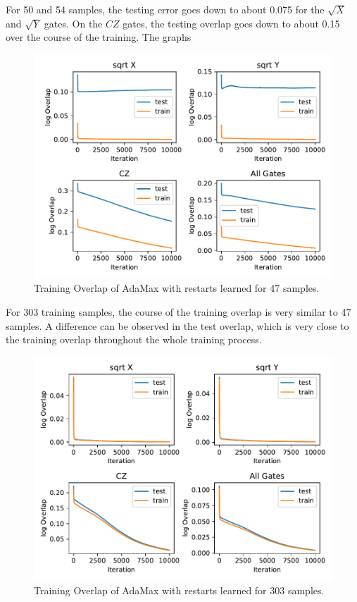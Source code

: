 For 50 and 54 samples, the testing error goes down to about 0.075 for the $\sqrt{X}$ and $\sqrt{Y}$ gates. 
On the $CZ$ gates, the testing overlap goes down to about 0.15 over the course of the training. The graphs 

\begin{figure}[H]
  \centering
  \includegraphics[width=\textwidth]{figures/results/AM-restarts-learned/avgOverlap_47.pdf}
  \caption[Training and Testing Overlaps for AdaMax with Random Restarts and $CZ$ Gates Learned - 47 Samples]{Training 
  Overlap of AdaMax with restarts learned for 47 samples.}
  \label{fig:am_overlap_47}
\end{figure}

For 303 training samples, the course of the training overlap is very similar to 47 samples.
A difference can be observed in the test overlap, which is very close to the training overlap 
throughout the whole training process.

\begin{figure}[H]
  \centering
  \includegraphics[width=\textwidth]{figures/results/AM-restarts-learned/avgOverlap_303.pdf}
  \caption[Training and Testing Overlaps for AdaMax with Random Restarts and $CZ$ Gates Learned - 303 Samples]{Training 
  Overlap of AdaMax with restarts learned for 303 samples.}
  \label{fig:am_overlap_303}
\end{figure}
